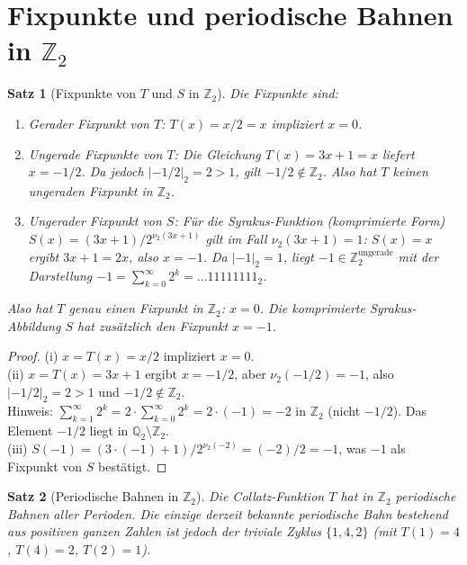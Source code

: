 \documentclass[12pt,a4paper]{article}
\newtheorem{theorem}{Satz}[section]
\begin{document}
\section{Fixpunkte und periodische Bahnen in $\mathbb{Z}_2$}\label{sec:fixpunkte}

\begin{theorem}[Fixpunkte von $T$ und $S$ in $\mathbb{Z}_2$]\label{thm:fixpunkte}
Die Fixpunkte sind:
\begin{enumerate}
  \item[(i)] Gerader Fixpunkt von $T$: $T(x) = x/2 = x$ impliziert $x = 0$.
  \item[(ii)] Ungerade Fixpunkte von $T$: Die Gleichung $T(x) = 3x+1 = x$ liefert $x = -1/2$.
              Da jedoch $|-1/2|_2 = 2 > 1$, gilt $-1/2 \notin \mathbb{Z}_2$. Also hat $T$
              \emph{keinen} ungeraden Fixpunkt in $\mathbb{Z}_2$.
  \item[(iii)] Ungerader Fixpunkt von $S$: Für die Syrakus-Funktion (komprimierte Form)
              $S(x) = (3x+1)/2^{\nu_2(3x+1)}$ gilt im Fall $\nu_2(3x+1)=1$: $S(x) = x$
              ergibt $3x+1 = 2x$, also $x = -1$.
              Da $|-1|_2 = 1$, liegt $-1 \in \mathbb{Z}_2^{\text{ungerade}}$
              mit der Darstellung $-1 = \sum_{k=0}^\infty 2^k = \ldots 11111111_2$.
\end{enumerate}
Also hat $T$ genau einen Fixpunkt in $\mathbb{Z}_2$: $x = 0$.
Die komprimierte Syrakus-Abbildung $S$ hat zusätzlich den Fixpunkt $x = -1$.
\end{theorem}

\begin{proof}
(i) $x = T(x) = x/2$ impliziert $x = 0$.\\
(ii) $x = T(x) = 3x+1$ ergibt $x = -1/2$, aber $\nu_2(-1/2) = -1$, also $|-1/2|_2 = 2 > 1$
und $-1/2 \notin \mathbb{Z}_2$.\\
Hinweis: $\sum_{k=1}^\infty 2^k = 2 \cdot \sum_{k=0}^\infty 2^k = 2 \cdot (-1) = -2$ in
$\mathbb{Z}_2$ (nicht $-1/2$). Das Element $-1/2$ liegt in $\mathbb{Q}_2 \setminus \mathbb{Z}_2$.\\
(iii) $S(-1) = (3 \cdot (-1) + 1)/2^{\nu_2(-2)} = (-2)/2 = -1$, was $-1$ als Fixpunkt von $S$ bestätigt.
\end{proof}

\begin{theorem}[Periodische Bahnen in $\mathbb{Z}_2$]\label{thm:periodisch}
Die Collatz-Funktion $T$ hat in $\mathbb{Z}_2$ periodische Bahnen aller Perioden.
Die einzige derzeit bekannte periodische Bahn bestehend aus \emph{positiven ganzen Zahlen}
ist jedoch der triviale Zyklus $\{1, 4, 2\}$ (mit $T(1)=4$, $T(4)=2$, $T(2)=1$).
\end{theorem}
\end{document}
